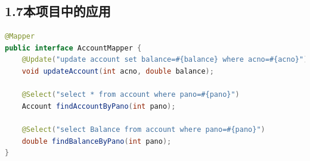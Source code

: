 \documentclass[24pt,a4paper]{article}%
\begin{document}
\subsection*{\songti 1.7本项目中的应用}

\begin{lstlisting}[language=Java]
@Mapper
public interface AccountMapper {
    @Update("update account set balance=#{balance} where acno=#{acno}")
    void updateAccount(int acno, double balance);
    
    @Select("select * from account where pano=#{pano}")
    Account findAccountByPano(int pano);
    
    @Select("select Balance from account where pano=#{pano}")
    double findBalanceByPano(int pano);
}
\end{lstlisting}

\newpage
\end{document}
